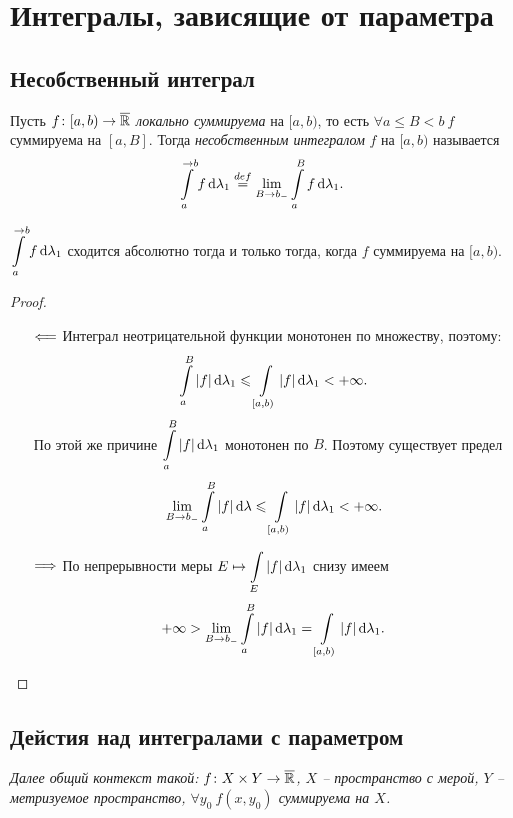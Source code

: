 \chapter{Интегралы, зависящие от параметра}

\section{Несобственный интеграл}

\begin{definition}
    Пусть $f \colon [a, b) \to \overline{\mathbb{R}}$ \textit{локально суммируема} на $[a, b)$, то
    есть $\forall a \leqslant B < b~ f$ суммируема на $[a, B]$. Тогда \textit{несобственным
    интегралом} $f$ на $[a, b)$ называется
    \[
        \int\limits_a^{\to b}{f \,\mathrm{d} \lambda_1} \overset{def}{\underset{}{=}} \lim_{B \to b_-}{\int\limits_a^B{f \,\mathrm{d} \lambda_1}}
    .\]
\end{definition}

\begin{theorem}
    $\displaystyle \int\limits_a^{\to b}{f \,\mathrm{d} \lambda_1}$ сходится абсолютно тогда и только тогда,
    когда $f$ суммируема на $[a, b)$.
\end{theorem}
\begin{proof}
    \enewline
    \begin{itemize}
        \item[$\Longleftarrow$] Интеграл неотрицательной функции монотонен по множеству, поэтому:
            \[
                \int\limits_a^B{|f| \,\mathrm{d} \lambda_1} \leqslant \int\limits_{[a, b)}{|f| \,\mathrm{d} \lambda_1} < +\infty
            .\]
            По этой же причине $\displaystyle \int\limits_a^B{|f| \,\mathrm{d} \lambda_1}$ монотонен по $B$.
            Поэтому существует предел
            \[
                \lim_{B \to b_-}{\int\limits_a^B{|f| \,\mathrm{d} \lambda}} \leqslant  
                \int\limits_{[a, b)}{|f| \,\mathrm{d} \lambda_1} < +\infty
            .\]
        \item[$\Longrightarrow$] По непрерывности меры $\displaystyle E \mapsto \int\limits_E{|f| \,\mathrm{d} \lambda_1}$ снизу
            имеем
            \[
                +\infty > \lim_{B \to b_-}{\int\limits_a^B{|f| \,\mathrm{d} \lambda_1}} = \int\limits_{[a, b)}{|f| \,\mathrm{d} \lambda_1}
            .\]
    \end{itemize}
\end{proof}

\section{Дейстия над интегралами с параметром}

\textit{Далее общий контекст такой: $f \colon X \times Y \to \overline{\mathbb{R}}$,
    $X$ -- пространство с мерой, $Y$ -- метризуемое пространство, $\forall y_0~ f(x, y_0)$ суммируема на $X$.}

